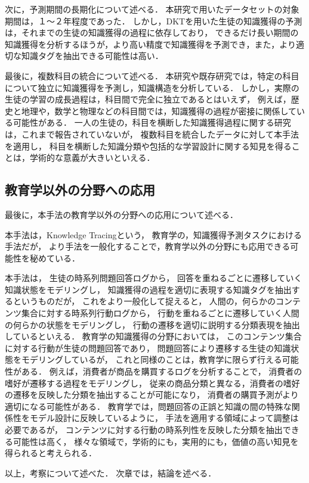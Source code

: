 次に，予測期間の長期化について述べる．
本研究で用いたデータセットの対象期間は，１〜２年程度であった．
しかし，DKTを用いた生徒の知識獲得の予測は，それまでの生徒の知識獲得の過程に依存しており，
できるだけ長い期間の知識獲得を分析するほうが，より高い精度で知識獲得を予測でき，また，より適切な知識タグを抽出できる可能性は高い．


最後に，複数科目の統合について述べる．
本研究や既存研究では，特定の科目について独立に知識獲得を予測し，知識構造を分析している．
しかし，実際の生徒の学習の成長過程は，科目間で完全に独立であるとはいえず，
例えば，歴史と地理や，数学と物理などの科目間では，知識獲得の過程が密接に関係している可能性がある．
一人の生徒の，科目を横断した知識獲得過程に関する研究は，これまで報告されていないが，
複数科目を統合したデータに対して本手法を適用し，
科目を横断した知識分類や包括的な学習設計に関する知見を得ることは，学術的な意義が大きいといえる．


\subsection{教育学以外の分野への応用}
最後に，本手法の教育学以外の分野への応用について述べる．

本手法は，Knowledge Tracingという，
教育学の，知識獲得予測タスクにおける手法だが，
より手法を一般化することで，教育学以外の分野にも応用できる可能性を秘めている．

本手法は，
生徒の時系列問題回答ログから，
回答を重ねるごとに遷移していく知識状態をモデリングし，
知識獲得の過程を適切に表現する知識タグを抽出するというものだが，
これをより一般化して捉えると，
人間の，何らかのコンテンツ集合に対する時系列行動ログから，
行動を重ねるごとに遷移していく人間の何らかの状態をモデリングし，
行動の遷移を適切に説明する分類表現を抽出しているといえる．
教育学の知識獲得の分野においては，
このコンテンツ集合に対する行動が生徒の問題回答であり，
問題回答により遷移する生徒の知識状態をモデリングしているが，
これと同様のことは，教育学に限らず行える可能性がある．
例えば，消費者が商品を購買するログを分析することで，
消費者の嗜好が遷移する過程をモデリングし，
従来の商品分類と異なる，消費者の嗜好の遷移を反映した分類を抽出することが可能になり，
消費者の購買予測がより適切になる可能性がある．
教育学では，問題回答の正誤と知識の間の特殊な関係性をモデル設計に反映しているように，
手法を適用する領域によって調整は必要であるが，
コンテンツに対する行動の時系列性を反映した分類を抽出できる可能性は高く，
様々な領域で，学術的にも，実用的にも，価値の高い知見を得られると考えられる．




\vvspace
以上，考察について述べた．
次章では，結論を述べる．
